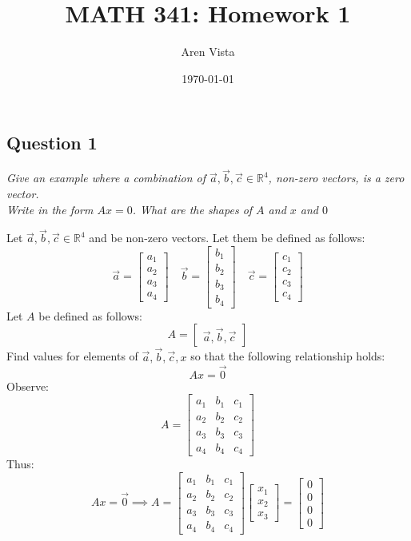 \documentclass[11pt]{article}
\title{ MATH 341: Homework 1}
\author{ Aren Vista }
\date{\today}
\theoremstyle{plain}
\begin{document}
\maketitle
\pagebreak
\begin{center}
	\section*{Question 1}
\end{center}
\begin{center}
	\textit{Give an example where a combination of $\vec{a}, \vec{b}, \vec{c} \in \mathbb{R}^4$, non-zero vectors, is a zero vector.} \\
	\textit{Write in the form $Ax=0$. What are the shapes of $A$ and $x$ and $0$}
\end{center}
Let $\vec{a}, \vec{b}, \vec{c} \in \mathbb{R}^4$ and be non-zero vectors. Let them be defined as follows:
\[
	\vec{a} = \begin{bmatrix}
		a_1 \\ a_2 \\ a_3 \\ a_4
	\end{bmatrix} \quad
	\vec{b} = \begin{bmatrix}
		b_1 \\ b_2 \\ b_3 \\ b_4
	\end{bmatrix} \quad
	\vec{c} = \begin{bmatrix}
		c_1 \\ c_2 \\ c_3 \\ c_4
	\end{bmatrix}
\]
Let $A$ be defined as follows:
\[
	A = \begin{bmatrix}
		\vec{a}, \vec{b}, \vec{c}
	\end{bmatrix}
\]
Find values for elements of $\vec{a}, \vec{b}, \vec{c}, x$ so that the following relationship holds:
\[
	Ax = \vec{0}
\]
Observe:
\[
	A = \begin{bmatrix}
		a_1 & b_1 & c_1 \\
		a_2 & b_2 & c_2 \\
		a_3 & b_3 & c_3 \\
		a_4 & b_4 & c_4
	\end{bmatrix}
\]
Thus:
\[
	Ax=\vec{0} \implies
	A = \begin{bmatrix}
		a_1 & b_1 & c_1 \\
		a_2 & b_2 & c_2 \\
		a_3 & b_3 & c_3 \\
		a_4 & b_4 & c_4
	\end{bmatrix}
	\begin{bmatrix}
		x_1 \\ x_2 \\ x_3
	\end{bmatrix}
	= \begin{bmatrix}
		0 \\ 0 \\ 0 \\ 0
	\end{bmatrix}
\]
\end{document}
